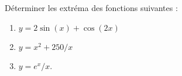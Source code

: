\begin{exercice}\label{exo0012}

Déterminer les extréma des fonctions suivantes :
\begin{enumerate}

\item
$y=2\sin(x)+\cos(2x)$

\item
$y=x^2+250/x$

\item
$y=e^x/x$.

\end{enumerate}


\end{exercice}

